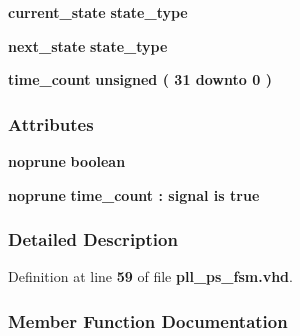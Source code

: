 \begin{DoxyCompactItemize}
\item 
{\bf current\+\_\+state} {\bfseries {\bfseries {\bf state\+\_\+type}} \textcolor{vhdlchar}{ }} 
\item 
{\bf next\+\_\+state} {\bfseries {\bfseries {\bf state\+\_\+type}} \textcolor{vhdlchar}{ }} 
\item 
{\bf time\+\_\+count} {\bfseries \textcolor{comment}{unsigned}\textcolor{vhdlchar}{ }\textcolor{vhdlchar}{(}\textcolor{vhdlchar}{ }\textcolor{vhdlchar}{ } \textcolor{vhdldigit}{31} \textcolor{vhdlchar}{ }\textcolor{keywordflow}{downto}\textcolor{vhdlchar}{ }\textcolor{vhdlchar}{ } \textcolor{vhdldigit}{0} \textcolor{vhdlchar}{ }\textcolor{vhdlchar}{)}\textcolor{vhdlchar}{ }} 
\end{DoxyCompactItemize}
\subsubsection*{Attributes}
 \begin{DoxyCompactItemize}
\item 
{\bf noprune} {\bfseries \textcolor{comment}{boolean}\textcolor{vhdlchar}{ }} 
\item 
{\bf noprune} {\bfseries {\bfseries {\bf time\+\_\+count}} \textcolor{vhdlchar}{ }\textcolor{vhdlchar}{\+:}\textcolor{vhdlchar}{ }\textcolor{keywordflow}{signal}\textcolor{vhdlchar}{ }\textcolor{keywordflow}{is}\textcolor{vhdlchar}{ }\textcolor{vhdlchar}{ }\textcolor{vhdlchar}{ }\textcolor{vhdlchar}{ }\textcolor{vhdlchar}{true}\textcolor{vhdlchar}{ }} 
\end{DoxyCompactItemize}


\subsubsection{Detailed Description}


Definition at line {\bf 59} of file {\bf pll\+\_\+ps\+\_\+fsm.\+vhd}.



\subsubsection{Member Function Documentation}
